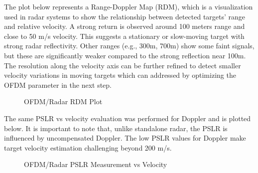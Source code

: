 \documentclass[conference]{IEEEtran}
\begin{document}
The plot below represents a Range-Doppler Map (RDM), which is a visualization used in radar systems to show the relationship between detected targets' range and relative velocity. A strong return is observed around 100 meters range and close to 50 m/s velocity. This suggests a stationary or slow-moving target with strong radar reflectivity. Other ranges (e.g., 300m, 700m) show some faint signals, but these are significantly weaker compared to the strong reflection near 100m. The resolution along the velocity axis can be further refined to detect smaller velocity variations in moving targets which can addressed by optimizing the OFDM parameter in the next step. 

\begin{figure}[H]
\centering
{}
\caption{OFDM/Radar RDM Plot}
\end{figure} 

The same PSLR vs velocity evaluation was performed for Doppler and is plotted below. It is important to note that, unlike standalone radar, the PSLR is influenced by uncompensated Doppler. The low PSLR values for Doppler make target velocity estimation challenging beyond 200 m/s.

\begin{figure}[H]
\centering
{}
\caption{OFDM/Radar PSLR Measurement vs Velocity}
\end{figure} 
\end{document}
